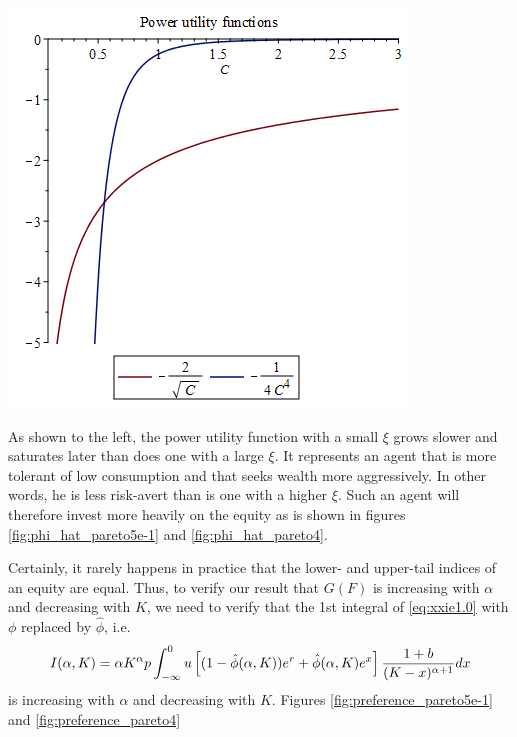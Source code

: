 \documentclass{article}
\newcommand{\1}[1]{
  \mathbf{1}_{\{#1\}}
}
\begin{document}
\begin{minipage}{0.5\linewidth}
  \includegraphics[width=\textwidth]{power_utilities.png}
\end{minipage}\hfill
\begin{minipage}{0.42\textwidth}
  As shown to the left, the power utility function with a small
  $\xi$ grows slower and saturates later than does one with a large
  $\xi$. It represents an agent that is more tolerant of low
  consumption and that seeks wealth more aggressively. In other
  words, he is less risk-avert than is one with a higher $\xi$.
  Such an agent will therefore invest more heavily on the equity as
  is shown in figures \ref{fig:phi_hat_pareto5e-1} and
  \ref{fig:phi_hat_pareto4}.
\end{minipage}
Certainly, it rarely happens in practice that the lower- and
upper-tail indices of an equity are equal. Thus, to verify our result
that $G(F)$ is increasing with $\alpha$ and decreasing with $K$, we
need to verify that the 1st integral of \eqref{eq:xxie1.0} with $\phi$
replaced by $\hat\phi$, i.e.
\[
I(\alpha, K) = 
  \alpha K^\alpha  p
  \int_{-\infty}^0
  u\left[ (1 - \hat\phi(\alpha, K)) e^r + \hat\phi(\alpha, K) e^x \right]
  {1 + b \over (K - x)^{\alpha + 1}} dx
\]
is increasing with $\alpha$ and decreasing with $K$. Figures
\ref{fig:preference_pareto5e-1} and \ref{fig:preference_pareto4}
\end{document}
